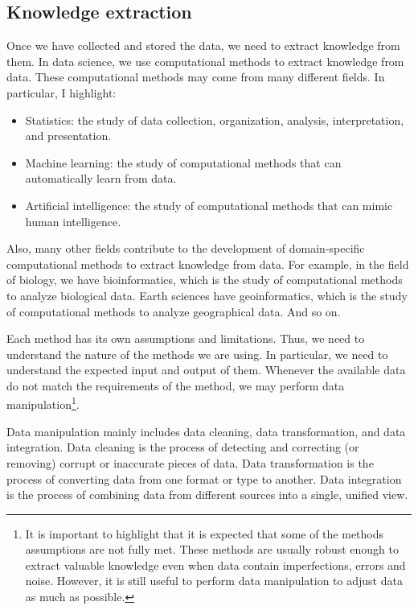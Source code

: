 \subsection{Knowledge extraction}

Once we have collected and stored the data, we need to extract knowledge from them.  In
data science, we use computational methods to extract knowledge from data.  These
computational methods may come from many different fields.  In particular, I highlight:
\begin{itemize}
  \item Statistics: the study of data collection, organization, analysis, interpretation,
    and presentation.
  \item Machine learning: the study of computational methods that can automatically learn from data.
  \item Artificial intelligence: the study of computational methods that can mimic human
    intelligence.
\end{itemize}

Also, many other fields contribute to the development of domain-specific computational
methods to extract knowledge from data.  For example, in the field of biology, we have
bioinformatics, which is the study of computational methods to analyze biological data.
Earth sciences have geoinformatics, which is the study of computational methods to
analyze geographical data.  And so on.

Each method has its own assumptions and limitations.  Thus, we need to understand the
nature of the methods we are using.  In particular, we need to understand the
expected input and output of them.  Whenever the available data do not match the
requirements of the method, we may perform data manipulation\footnote{%
  It is important to highlight that it is expected that some of the methods assumptions
  are not fully met.  These methods are usually robust enough to extract valuable
  knowledge even when data contain imperfections, errors and noise.  However, it is still
  useful to perform data manipulation to adjust data as much as possible.%
}.

Data manipulation mainly includes data cleaning, data transformation, and data
integration. Data cleaning is the process of detecting and correcting (or removing)
corrupt or inaccurate pieces of data.  Data transformation is the process of converting
data from one format or type to another.  Data integration is the process of combining
data from different sources into a single, unified view.

